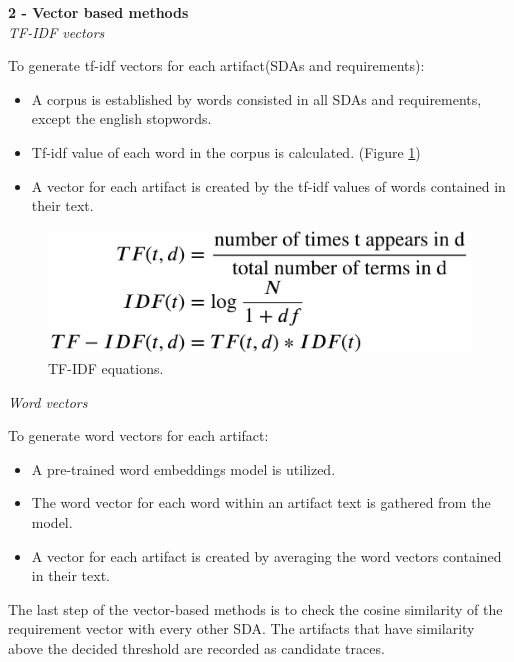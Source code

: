 \textbf{2 - Vector based methods}\\

\textit{TF-IDF vectors}

To generate tf-idf vectors for each artifact(SDAs and requirements):

\begin{itemize}
    \item A corpus is established by words consisted in all SDAs and requirements, except the english stopwords.
    \item Tf-idf value of each word in the corpus is calculated. (Figure \ref{fig:tfidf})
    \item A vector for each artifact is created by the tf-idf values of words contained in their text.
\end{itemize}


\begin{figure}[htb]
    \centering
    \includegraphics[width=0.75\linewidth]{figs/tfidf.png}
    \caption{TF-IDF equations.}
    \label{fig:tfidf}
\end{figure}


\textit{Word vectors}

To generate word vectors for each artifact:

\begin{itemize}
    \item A pre-trained word embeddings model is utilized.
    \item The word vector for each word within an artifact text is gathered from the model.
    \item A vector for each artifact is created by averaging the word vectors contained in their text.
\end{itemize}


The last step of the vector-based methods is to check the cosine similarity of the requirement vector with every other SDA. The artifacts that have similarity above the decided threshold are recorded as candidate traces.

